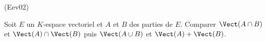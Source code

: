 \begin{tiny}(Eev02)\end{tiny} Soit $E$ un $K$-espace vectoriel et $A$ et $B$ des parties de $E$.
Comparer $\Vect(A \cap B)$ et $\Vect(A) \cap \Vect(B)$ puis $\Vect(A \cup B)$ et $\Vect(A) + \Vect(B)$.
